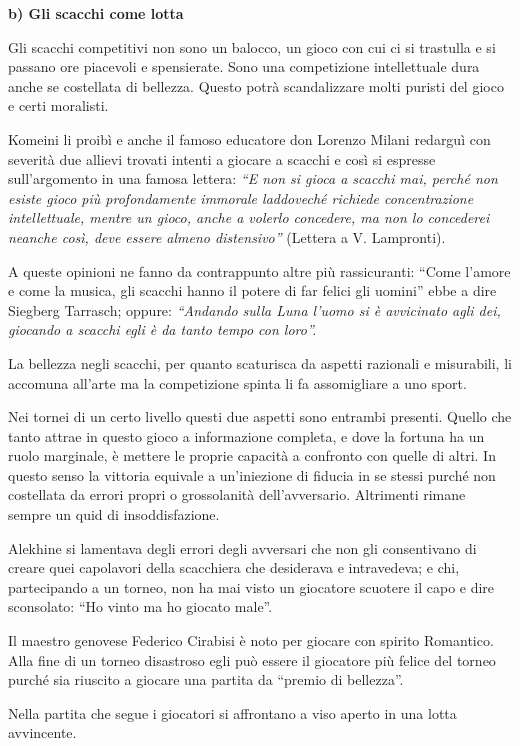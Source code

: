 \documentclass[
]{article}
\begin{document}
\textbf{b) Gli scacchi come lotta}

Gli scacchi competitivi non sono un balocco, un gioco con cui ci si
trastulla e si passano ore piacevoli e spensierate. Sono una
competizione intellettuale dura anche se costellata di bellezza. Questo
potrà scandalizzare molti puristi del gioco e certi moralisti.

Komeini li proibì e anche il famoso educatore don Lorenzo Milani
redarguì con severità due allievi trovati intenti a giocare a scacchi e
così si espresse sull'argomento in una famosa lettera: \emph{``E non si
gioca a scacchi mai, perché non esiste gioco più profondamente immorale
laddoveché richiede concentrazione intellettuale, mentre un gioco, anche
a volerlo concedere, ma non lo concederei neanche così, deve essere
almeno distensivo''} (Lettera a V. Lampronti).

A queste opinioni ne fanno da contrappunto altre più rassicuranti:
``Come l'amore e come la musica, gli scacchi hanno il potere di far
felici gli uomini'' ebbe a dire Siegberg Tarrasch; oppure:
\emph{``Andando sulla Luna l'uomo si è avvicinato agli dei, giocando a
scacchi egli è da tanto tempo con loro''.}

La bellezza negli scacchi, per quanto scaturisca da aspetti razionali e
misurabili, li accomuna all'arte ma la competizione spinta li fa
assomigliare a uno sport.

Nei tornei di un certo livello questi due aspetti sono entrambi
presenti. Quello che tanto attrae in questo gioco a informazione
completa, e dove la fortuna ha un ruolo marginale, è mettere le proprie
capacità a confronto con quelle di altri. In questo senso la vittoria
equivale a un'iniezione di fiducia in se stessi purché non costellata da
errori propri o grossolanità dell'avversario. Altrimenti rimane sempre
un quid di insoddisfazione.

Alekhine si lamentava degli errori degli avversari che non gli
consentivano di creare quei capolavori della scacchiera che desiderava e
intravedeva; e chi, partecipando a un torneo, non ha mai visto un
giocatore scuotere il capo e dire sconsolato: ``Ho vinto ma ho giocato
male''.

Il maestro genovese Federico Cirabisi è noto per giocare con spirito
Romantico. Alla fine di un torneo disastroso egli può essere il
giocatore più felice del torneo purché sia riuscito a giocare una
partita da ``premio di bellezza''.

Nella partita che segue i giocatori si affrontano a viso aperto in una
lotta avvincente.
\end{document}
